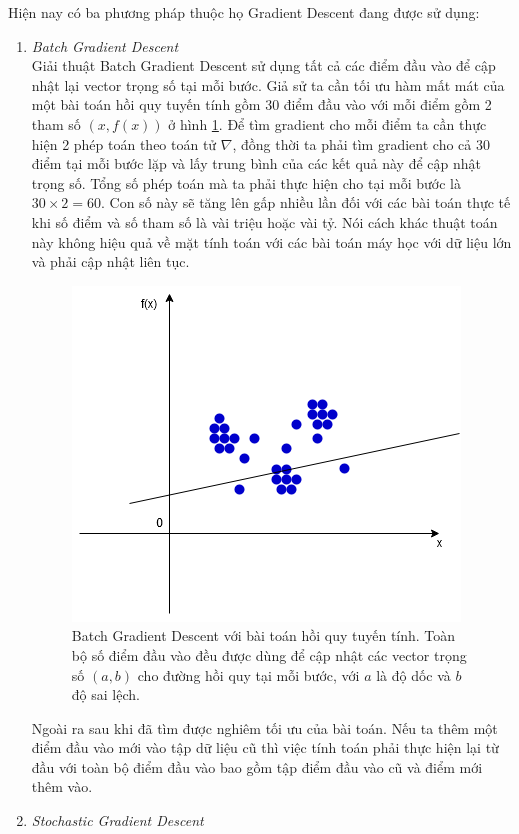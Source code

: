 Hiện nay có ba phương pháp thuộc họ Gradient Descent đang được sử dụng:
\begin{enumerate}
\item \emph{Batch Gradient Descent}\\
Giải thuật Batch Gradient Descent sử dụng tất cả các điểm đầu vào để cập nhật lại vector trọng số tại mỗi bước. Giả sử ta cần tối ưu hàm mất mát của một bài toán hồi quy tuyến tính gồm 30 điểm đầu vào với mỗi điểm gồm 2 tham số $\left(x,f\left(x\right)\right)$ ở hình \ref{fig:batch_gradient_descent}. Để tìm gradient cho mỗi điểm ta cần thực hiện 2 phép toán theo toán tử $\nabla$, đồng thời ta phải tìm gradient cho cả 30 điểm tại mỗi bước lặp và lấy trung bình của các kết quả này để cập nhật trọng số. Tổng số phép toán mà ta phải thực hiện cho tại mỗi bước là $30\times2=60$. Con số này sẽ tăng lên gấp nhiều lần đối với các bài toán thực tế khi số điểm và số tham số là vài triệu hoặc vài tỷ. Nói cách khác thuật toán này không hiệu quả về mặt tính toán với các bài toán máy học với dữ liệu lớn và phải cập nhật liên tục.
\begin{figure}[ht!]
	\centerline{\includegraphics[scale=0.6]{images/batch_gradient_descent.png}}
  	\caption{Batch Gradient Descent với bài toán hồi quy tuyến tính. Toàn bộ số điểm đầu vào đều được dùng để cập nhật các vector trọng số $(a,b)$ cho đường hồi quy tại mỗi bước, với $a$ là độ dốc và $b$ độ sai lệch.}
  	\label{fig:batch_gradient_descent}
\end{figure}
Ngoài ra sau khi đã tìm được nghiêm tối ưu của bài toán. Nếu ta thêm một điểm đầu vào mới vào tập dữ liệu cũ thì việc tính toán phải thực hiện lại từ đầu với toàn bộ điểm đầu vào bao gồm tập điểm đầu vào cũ và điểm mới thêm vào.
\item \emph{Stochastic Gradient Descent}\\

\end{enumerate}
